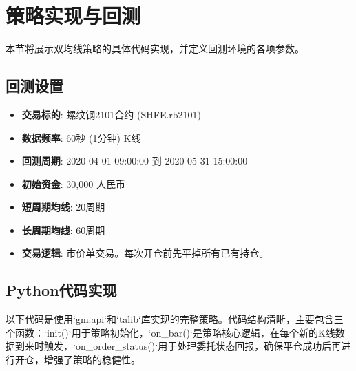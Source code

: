 \documentclass[UTF8]{ctexart}
\begin{document}
\section{策略实现与回测}

本节将展示双均线策略的具体代码实现，并定义回测环境的各项参数。

\subsection{回测设置}
\begin{itemize}
    \item \textbf{交易标的}: 螺纹钢2101合约 (SHFE.rb2101)
    \item \textbf{数据频率}: 60秒 (1分钟) K线
    \item \textbf{回测周期}: 2020-04-01 09:00:00 到 2020-05-31 15:00:00
    \item \textbf{初始资金}: 30,000 人民币
    \item \textbf{短周期均线}: 20周期
    \item \textbf{长周期均线}: 60周期
    \item \textbf{交易逻辑}: 市价单交易。每次开仓前先平掉所有已有持仓。
\end{itemize}

\subsection{Python代码实现}
以下代码是使用`gm.api`和`talib`库实现的完整策略。代码结构清晰，主要包含三个函数：`init()`用于策略初始化，`on_bar()`是策略核心逻辑，在每个新的K线数据到来时触发，`on_order_status()`用于处理委托状态回报，确保平仓成功后再进行开仓，增强了策略的稳健性。
\end{document}
